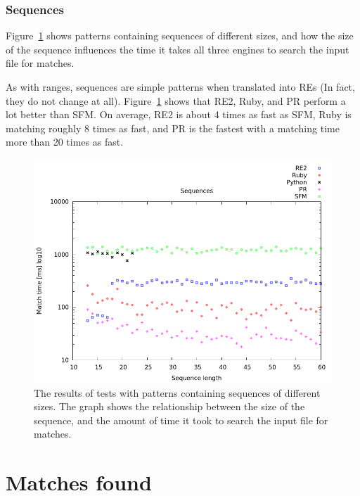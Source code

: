 \documentclass[12pt]{article}
\theoremstyle{definition}
\begin{document}
\subsubsection{Sequences}

Figure~\ref{graph:cases:sequences} shows patterns containing sequences of different sizes, and how the size of the sequence influences the time it takes all three engines to search the input file for matches.

As with ranges, sequences are simple patterns when translated into REs (In fact, they do not change at all). Figure~\ref{graph:cases:sequences} shows that RE2, Ruby, and PR perform a lot better than SFM. On average, RE2 is about 4 times as fast as SFM, Ruby is matching roughly 8 times as fast, and PR is the fastest with a matching time more than 20 times as fast.

\begin{figure}[H]
	\begin{center}
		\includegraphics[scale=0.55]{graphs/sequences.png}	
	\end{center}
	\caption{The results of tests with patterns containing sequences of different sizes. The graph shows the relationship between the size of the sequence, and the amount of time it took to search the input file for matches.}
	\label{graph:cases:sequences}
\end{figure}

\section{Matches found}
\end{document}

